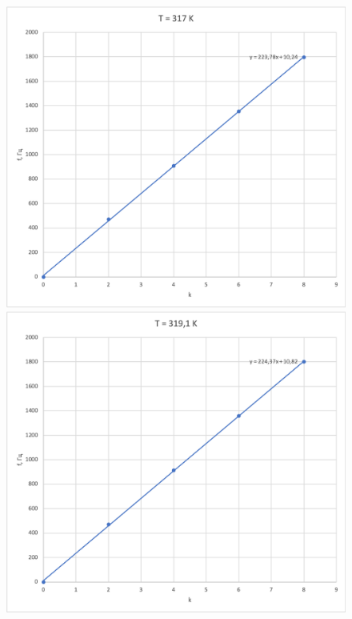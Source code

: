 \documentclass[a4paper, 12pt]{article}
\begin{document}
\begin{enumerate}
\begin{figure}[ph]
\begin{minipage}[h]{0.5\linewidth}
            \end{minipage}
            \vfill
            \begin{minipage}[h]{0.5\linewidth}
                \includegraphics[width=1\linewidth]{11.png}    
            \end{minipage}
            \hfill
            \begin{minipage}[h]{0.5\linewidth}
                \includegraphics[width=1\linewidth]{12.png}    
            \end{minipage}
        \end{figure}
        

\end{enumerate}
\end{document}
